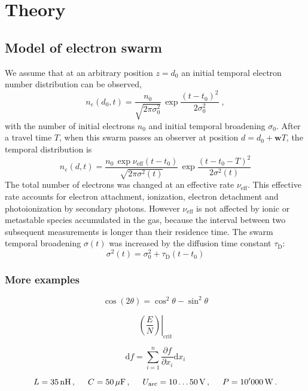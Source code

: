 \chapter{Theory}

\section{Model of electron swarm}

We assume that at an arbitrary position $z = d_0$ an initial temporal electron number distribution can be observed,
\begin{equation}
n_e(d_0, t) = \frac{n_0}{ \sqrt{2 \pi \sigma_0^2} } \, \exp{\frac{(t - t_0)^2}{2 \sigma_0^2} }  \;,
\label{eq.swarmstart}
\end{equation}
with the number of initial electrons $n_0$ and initial temporal broadening $\sigma_0$. After a travel time $T$, when this swarm passes an observer at position $d = d_0 + \mathbf{w} T$, the temporal distribution is
\begin{equation}
n_e(d, t) = \frac{n_0 \, \exp{\nu_\mathrm{eff} (t-t_0)}}{ \sqrt{2 \pi \sigma^2(t)} } \, \exp{\frac{(t - t_0 - T)^2}{2 \sigma^2(t)} }
\label{eq.swarmend}
\end{equation}
The total number of electrons was changed at an effective rate $\nu_\mathrm{eff}$. This effective rate accounts for electron attachment, ionization, electron detachment and photoionization by secondary photons. However $\nu_\mathrm{eff}$ is not affected by ionic or metastable species accumulated in the gas, because the interval between two subsequent measurements is longer than their residence time. The swarm temporal broadening $\sigma(t)$ was increased by the diffusion time constant $\tau_\mathrm{D}$:
\begin{equation}
\sigma^2(t) = \sigma_0^2 + \tau_\mathrm{D} (t-t_0)
\label{eq.diffusiontime}
\end{equation}

\subsection{More examples}

\begin{equation*}
    \cos (2\theta) = \cos^2 \theta - \sin^2 \theta
\end{equation*}

\begin{equation}
\left. \left( \frac{E}{N} \right) \right|_\mathrm{crit}
\end{equation}

\begin{equation}
   \mathrm{d}f = \sum_{i=1}^{n} \frac{\partial f}{\partial x_i} \mathrm{d}x_i 
\end{equation}


\begin{equation}
   L = 35\,\mathrm{nH}\,, \hskip 5mm  C = 50\,\mathrm{\mu F}\,, \hskip 5mm U_\mathrm{arc}=10\ldots50\,\mathrm{V}\,, \hskip 5mm P=10'000\,\mathrm{W}\,. 
\end{equation}



